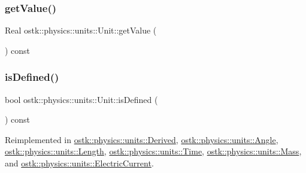 \mbox{\label{classostk_1_1physics_1_1units_1_1_unit_a0bfa6c131d5fb0bf1c4bd894ae84df17}} 
\subsubsection{\texorpdfstring{get\+Value()}{getValue()}}
{\footnotesize\ttfamily Real ostk\+::physics\+::units\+::\+Unit\+::get\+Value (\begin{DoxyParamCaption}{ }\end{DoxyParamCaption}) const}

\mbox{\label{classostk_1_1physics_1_1units_1_1_unit_a423ce1df3478f0892b10824b591ae1cc}} 
\subsubsection{\texorpdfstring{is\+Defined()}{isDefined()}}
{\footnotesize\ttfamily bool ostk\+::physics\+::units\+::\+Unit\+::is\+Defined (\begin{DoxyParamCaption}{ }\end{DoxyParamCaption}) const\hspace{0.3cm}{\ttfamily [virtual]}}



Reimplemented in \hyperlink{classostk_1_1physics_1_1units_1_1_derived_a4221766463c2f4ab478e4a882239eec6}{ostk\+::physics\+::units\+::\+Derived}, \hyperlink{classostk_1_1physics_1_1units_1_1_angle_a912562d12513b2fcee56262208206b62}{ostk\+::physics\+::units\+::\+Angle}, \hyperlink{classostk_1_1physics_1_1units_1_1_length_aa176a675943dfe488fe96005c5405304}{ostk\+::physics\+::units\+::\+Length}, \hyperlink{classostk_1_1physics_1_1units_1_1_time_a1b89925067e81636fa80f6e73eed3625}{ostk\+::physics\+::units\+::\+Time}, \hyperlink{classostk_1_1physics_1_1units_1_1_mass_ad6bb821365eff3a414d9fd07a7730d99}{ostk\+::physics\+::units\+::\+Mass}, and \hyperlink{classostk_1_1physics_1_1units_1_1_electric_current_a81ae490a737a49553a7c390b865486a7}{ostk\+::physics\+::units\+::\+Electric\+Current}.

